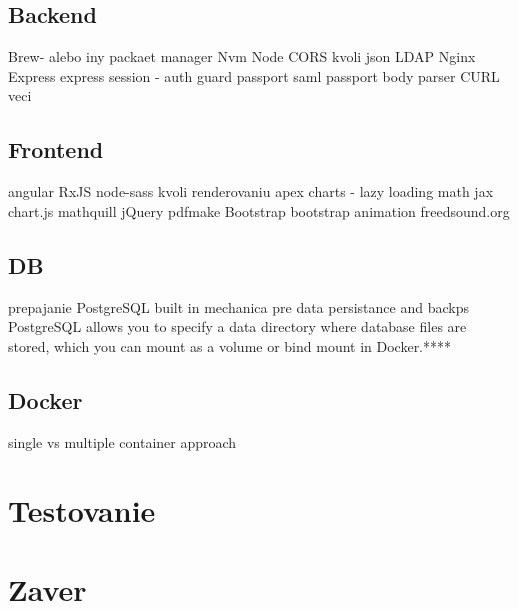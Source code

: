  \subsection{Backend}
 Brew- alebo iny packaet manager
 Nvm
 Node
 CORS kvoli json
 LDAP
 Nginx
 Express
 express session - auth guard
 passport saml
 passport
 body parser
 CURL veci
 \subsection{Frontend}
 angular
 RxJS
 node-sass kvoli renderovaniu
 apex charts - lazy loading
 math jax 
 chart.js 
 mathquill
 jQuery
 pdfmake
 Bootstrap
 bootstrap animation
 freedsound.org
 
 \subsection{DB}
 prepajanie
  PostgreSQL
  built in mechanica pre data persistance and backps PostgreSQL allows you to specify a data directory where database files are stored, which you can mount as a volume or bind mount in Docker.****

  \subsection{Docker}
  single vs multiple container approach

  \section{Testovanie}
  \section{Zaver}